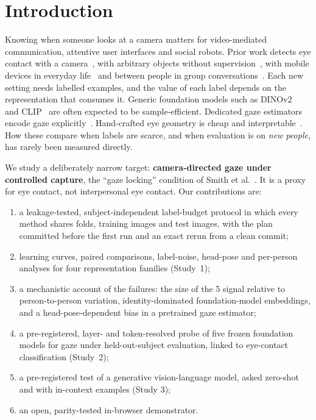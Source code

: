 \documentclass[10pt,twocolumn]{article}
\begin{document}
\section{Introduction}
Knowing when someone looks at a camera matters for video-mediated communication, attentive user interfaces and
social robots. Prior work detects eye contact with a camera~\cite{smith2013gazelocking}, with arbitrary objects
without supervision~\cite{zhang2017everyday}, with mobile devices in everyday life~\cite{bace2020quantification}
and between people in group conversations~\cite{muller2018robust,muller2021multimediate}. Each new setting needs
labelled examples, and the value of each label depends on the representation that consumes it. Generic foundation
models such as DINOv2~\cite{oquab2024dinov2} and CLIP~\cite{radford2021clip} are often expected to be
sample-efficient. Dedicated gaze estimators encode gaze explicitly~\cite{abdelrahman2023l2cs,cheng2024survey}.
Hand-crafted eye geometry is cheap and interpretable~\cite{kartynnik2019facemesh,ablavatski2020iris}. How these
compare when labels are scarce, and when evaluation is on \emph{new people}, has rarely been measured directly.

We study a deliberately narrow target: \textbf{camera-directed gaze under controlled capture}, the ``gaze locking''
condition of Smith et al.~\cite{smith2013gazelocking}. It is a proxy for eye contact, not interpersonal eye contact.
Our contributions are:
\begin{enumerate}\itemsep0pt
\item a leakage-tested, subject-independent label-budget protocol in which every method shares folds, training
images and test images, with the plan committed before the first run and an exact rerun from a clean commit;
\item learning curves, paired comparisons, label-noise, head-pose and per-person analyses for four representation
families (Study~1);
\item a mechanistic account of the failures: the size of the 5\textdegree{} signal relative to person-to-person
variation, identity-dominated foundation-model embeddings, and a head-pose-dependent bias in a pretrained gaze
estimator;
\item a pre-registered, layer- and token-resolved probe of five frozen foundation models for gaze under
held-out-subject evaluation, linked to eye-contact classification (Study~2);
\item a pre-registered test of a generative vision-language model, asked zero-shot and with in-context examples (Study 3);
\item an open, parity-tested in-browser demonstrator.
\end{enumerate}
\end{document}
